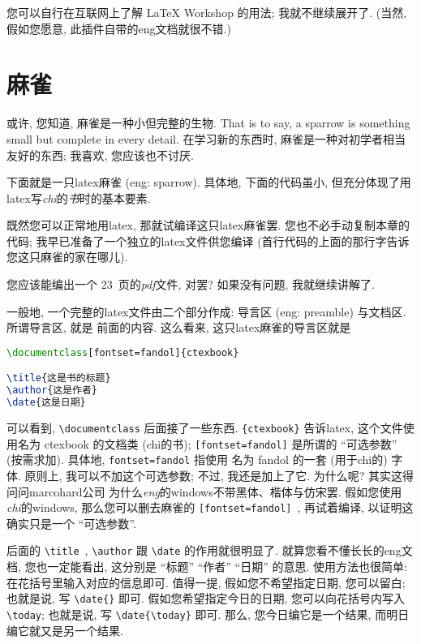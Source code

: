 您可以自行在互联网上了解 LaTeX Workshop 的用法;
我就不继续展开了.
(当然, 假如您愿意, 此插件自带的\gls{eng}文档就很不错.)

\section{麻雀}

或许, 您知道, 麻雀是一种小但完整的生物.
That is to say,
a sparrow is something small but complete in every detail.
在学习新的东西时, 麻雀是一种对初学者相当友好的东西;
我喜欢, 您应该也不讨厌.

下面就是一只\gls{latex}麻雀 (\gls{eng}:  sparrow).
具体地, 下面的代码虽小,
但充分体现了用\gls{latex}写\emph{\gls{chi}}的\emph{书}时的基本要素.



既然您可以正常地用\gls{latex}, 那就试编译这只\gls{latex}麻雀罢.
您也不必手动复制本章的代码;
我早已准备了一个独立的\gls{latex}文件供您编译
(首行代码的上面的那行字告诉您这只麻雀的家在哪儿).

您应该能编出一个 23~页的\emph{\gls{pdf}}文件, 对罢?
如果没有问题, 我就继续讲解了.

一般地, 一个完整的\gls{latex}文件由二个部分作成:
导言区 (\gls{eng}: preamble) 与文档区.
所谓导言区, 就是 \verb`` 前面的内容.
这么看来, 这只\gls{latex}麻雀的导言区就是
\begin{lstlisting}[language=TeX]
\documentclass[fontset=fandol]{ctexbook}

\title{这是书的标题}
\author{这是作者}
\date{这是日期}
\end{lstlisting}

可以看到, \verb`\documentclass` 后面接了一些东西.
\verb`{ctexbook}` 告诉\gls{latex},
这个文件使用名为 \textsf{ctexbook} 的文档类 (\gls{chi}的书);
\verb`[fontset=fandol]` 是所谓的 ``可选参数'' (按需求加).
具体地, \verb`fontset=fandol` 指使用%
名为 fandol 的一套 (用于\gls{chi}的) 字体.
原则上, 我可以不加这个可选参数;
不过, 我还是加上了它.
为什么呢?
其实这得问问\gls{marcohard}公司
为什么\emph{\gls{eng}}的\gls{windows}不带黑体、楷体与仿宋罢.
假如您使用\emph{\gls{chi}}的\gls{windows},
那么您可以删去麻雀的 \verb`[fontset=fandol]`~,
再试着编译,
以证明这确实只是一个 ``可选参数''.

后面的
\verb`\title`~, \verb`\author` 跟 \verb`\date`
的作用就很明显了.
就算您看不懂长长的\gls{eng}文档, 您也一定能看出,
这分别是 ``标题'' ``作者'' ``日期'' 的意思.
使用方法也很简单:
在花括号里输入对应的信息即可.
值得一提, 假如您不希望指定日期, 您可以留白;
也就是说, 写 \verb`\date{}` 即可.
假如您希望指定今日的日期,
您可以向花括号内写入 \verb`\today`;
也就是说, 写 \verb`\date{\today}` 即可.
那么, 您今日编它是一个结果, 而明日编它就又是另一个结果.

